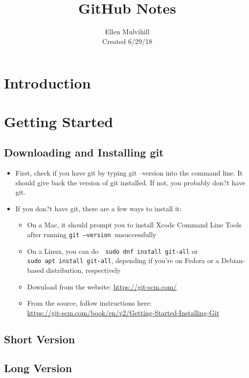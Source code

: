 \documentclass[12pt, letterpaper]{article} 	%
\title{\Huge GitHub Notes}
\author{Ellen Mulvihill \\ Created 6/29/18}
\begin{document}
\maketitle
\tableofcontents
\clearpage

\section{Introduction}

\section{Getting Started}

\subsection{Downloading and Installing git}
\begin{itemize}
	\item First, check if you have git by typing git --version into the command line. It should give back the version of git installed. If not, you probably don?t have git.
	\item If you don?t have git, there are a few ways to install it:
	\begin{itemize}
		\item On a Mac, it should prompt you to install Xcode Command Line Tools after running {\tt git --version }unsuccessfully
		\item On a Linux, you can do{\tt\, sudo dnf install git-all} or \\ {\tt sudo apt install git-all}, depending if you're on Fedora or a Debian-based distribution, respectively
		\item Download from the website: \url{https://git-scm.com/}
		\item From the source, follow instructions here: \\ \url{https://git-scm.com/book/en/v2/Getting-Started-Installing-Git }
	\end{itemize}
\end{itemize}

\subsection{Short Version}

\subsection{Long Version}
\end{document}
